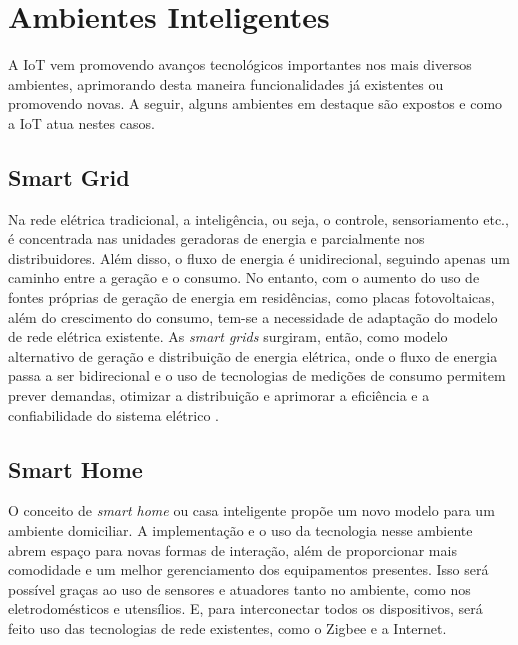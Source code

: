 \section{Ambientes Inteligentes}

A IoT vem promovendo avanços tecnológicos importantes nos mais diversos ambientes, aprimorando desta maneira funcionalidades já existentes ou promovendo novas. A seguir, alguns ambientes em destaque são expostos e como a IoT atua nestes casos. 

\subsection{Smart Grid}

Na rede elétrica tradicional, a inteligência, ou seja, o controle, sensoriamento etc., é concentrada nas unidades geradoras de energia e parcialmente nos distribuidores. Além disso, o fluxo de energia é unidirecional, seguindo apenas um caminho entre a geração e o consumo. No entanto, com o aumento do uso de fontes próprias de geração de energia em residências, como placas fotovoltaicas, além do crescimento do consumo, tem-se a necessidade de adaptação do modelo de rede elétrica existente. As \textit{smart grids} surgiram, então, como modelo alternativo de geração e distribuição de energia elétrica, onde o fluxo de energia passa a ser bidirecional e o uso de tecnologias de medições de consumo permitem prever demandas, otimizar a distribuição e aprimorar a eficiência e a confiabilidade do sistema elétrico \cite{Cecilia2016}. 


\subsection{Smart Home}

O conceito de \textit{smart home} ou casa inteligente propõe um novo modelo para um ambiente domiciliar. A implementação e o uso da tecnologia nesse ambiente abrem espaço para novas formas de interação, além de proporcionar mais comodidade e um melhor gerenciamento dos equipamentos presentes. Isso será possível graças ao uso de sensores e atuadores tanto no ambiente, como nos eletrodomésticos e utensílios. E, para interconectar todos os dispositivos, será feito uso das tecnologias de rede existentes, como o Zigbee e a Internet.

